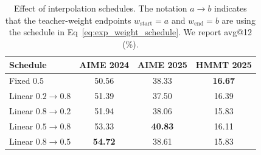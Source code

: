 \begin{table}[t]
\centering
\small
\caption{
Effect of interpolation schedules. The notation $a\rightarrow b$ indicates that the teacher-weight endpoints $w_{\mathrm{start}}=a$ and $w_{\mathrm{end}}=b$ are using the schedule in Eq~\ref{eq:exp_weight_schedule}. We report avg@12 (\%).
}
\label{tab:interpolation_schedule_ablation}
\begin{tabular}{lccc}
\toprule
Schedule
& AIME 2024
& AIME 2025
& HMMT 2025 \\
\midrule
Fixed $0.5$
& 50.56
& 38.33
& \textbf{16.67} \\

Linear $0.2\rightarrow0.8$
& 51.39
& 37.50
& 16.39 \\

Linear $0.8\rightarrow0.2$
& 51.94
& 38.06
& 15.83 \\

Linear $0.5\rightarrow0.8$
& 53.33
& \textbf{40.83}
& 16.11 \\

Linear $0.8\rightarrow0.5$
& \textbf{54.72}
& 38.61
& 15.83 \\
\bottomrule
\end{tabular}
\end{table}